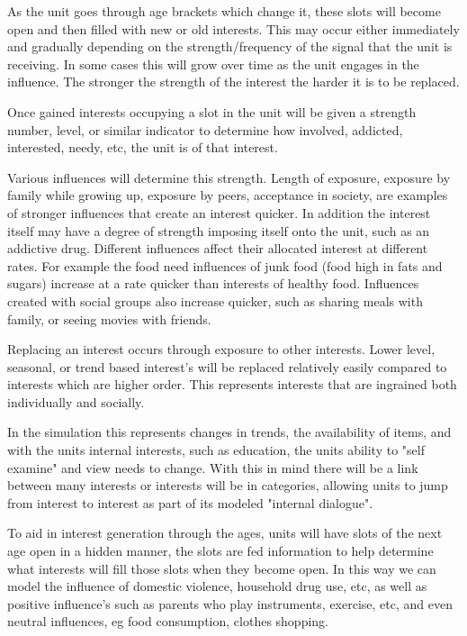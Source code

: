 As the unit goes through age brackets which change it, these slots will become open and then filled with new or old interests. This may occur either immediately and gradually depending on the strength/frequency of the signal that the unit is receiving. In some cases this will grow over time as the unit engages in the influence. The stronger the strength of the interest the harder it is to be replaced.

Once gained interests occupying a slot in the unit will be given a strength number, level, or similar indicator to determine how involved, addicted, interested, needy, etc, the unit is of that interest. 

Various influences will determine this strength. Length of exposure, exposure by family while growing up, exposure by peers, acceptance in society, are examples of stronger influences that create an interest quicker. In addition the interest itself may have a degree of strength imposing itself onto the unit, such as an addictive drug. Different influences affect their allocated interest at different rates. For example the food need influences of junk food (food high in fats and sugars) increase at a rate quicker than interests of healthy food. Influences created with social groups also increase quicker, such as sharing meals with family, or seeing movies with friends.


Replacing an interest occurs through exposure to other interests. Lower level, seasonal, or trend based interest's will be replaced relatively easily compared to interests which are higher order. This represents interests that are ingrained both individually and socially. 

In the simulation this represents changes in trends, the availability of items, and with the units internal interests, such as education, the units ability to "self examine" and view needs to change. With this in mind there will be a link between many interests or interests will be in categories, allowing units to jump from interest to interest as part of its modeled "internal dialogue".

To aid in interest generation through the ages, units will have slots of the next age open in a hidden manner, the slots are fed information to help determine what interests will fill those slots when they become open. In this way we can model the influence of domestic violence, household drug use, etc, as well as positive influence's such as parents who play instruments, exercise, etc, and even neutral influences, eg food consumption, clothes shopping.

